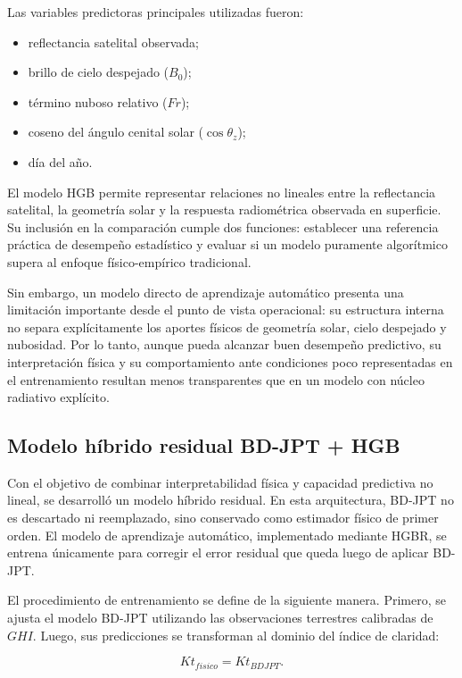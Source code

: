 \documentclass[../main.tex]{subfiles}
\begin{document}
Las variables predictoras principales utilizadas fueron:

\begin{itemize}
\item reflectancia satelital observada;
\item brillo de cielo despejado ($B_0$);
\item término nuboso relativo ($Fr$);
\item coseno del ángulo cenital solar ($\cos\theta_z$);
\item día del año.
\end{itemize}

El modelo HGB permite representar relaciones no lineales entre la reflectancia satelital, la geometría solar y la respuesta radiométrica observada en superficie. Su inclusión en la comparación cumple dos funciones: establecer una referencia práctica de desempeño estadístico y evaluar si un modelo puramente algorítmico supera al enfoque físico-empírico tradicional.

Sin embargo, un modelo directo de aprendizaje automático presenta una limitación importante desde el punto de vista operacional: su estructura interna no separa explícitamente los aportes físicos de geometría solar, cielo despejado y nubosidad. Por lo tanto, aunque pueda alcanzar buen desempeño predictivo, su interpretación física y su comportamiento ante condiciones poco representadas en el entrenamiento resultan menos transparentes que en un modelo con núcleo radiativo explícito.

\subsection{Modelo híbrido residual BD-JPT + HGB}

Con el objetivo de combinar interpretabilidad física y capacidad predictiva no lineal, se desarrolló un modelo híbrido residual. En esta arquitectura, BD-JPT no es descartado ni reemplazado, sino conservado como estimador físico de primer orden. El modelo de aprendizaje automático, implementado mediante HGBR, se entrena únicamente para corregir el error residual que queda luego de aplicar BD-JPT.

El procedimiento de entrenamiento se define de la siguiente manera. Primero, se ajusta el modelo BD-JPT utilizando las observaciones terrestres calibradas de $GHI$. Luego, sus predicciones se transforman al dominio del índice de claridad:

\begin{equation}
Kt_{fisico} = Kt_{BDJPT}.
\end{equation}
\end{document}
